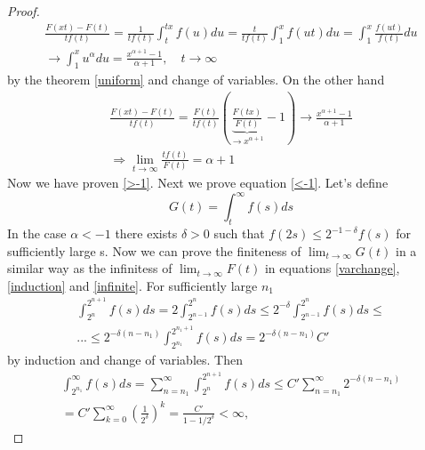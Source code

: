 \documentclass[english,12pt,a4paper,pdftex,sci,utf8]{aaltothesis} %
\begin{document}
\begin{proof}
\begin{equation*}
\begin{split}
\frac{F(xt)-F(t)}{tf(t)} = \frac{1}{tf(t)} \int_{t}^{tx}f(u)du = \frac{t}{tf(t)} \int_{1}^{x} f(ut)du = \int_1^x \frac{f(ut)}{f(t)}du \\
\rightarrow \int_1^x u^{\alpha}du = \frac{x^{\alpha+1}-1}{\alpha+1}, \quad t \rightarrow \infty
\end{split}
\end{equation*}
by the theorem \ref{uniform} and change of variables. On the other hand 
\begin{equation*}
\begin{split}
\frac{F(xt)-F(t)}{tf(t)} = \frac{F(t)}{tf(t)}\left(\underbrace{\frac{F(tx)}{F(t)}}_{\rightarrow x^{\alpha+1}} - 1\right) \rightarrow \frac{x^{\alpha+1}-1}{\alpha+1} \\
\Rightarrow \lim_{t \rightarrow \infty} \frac{tf(t)}{F(t)}= \alpha + 1
\end{split}
\end{equation*}
Now we have proven \ref{>-1}. Next we prove equation \ref{<-1}. Let's define
\begin{equation*}
G(t) = \int_{t}^{\infty} f(s)ds
\end{equation*}
In the case $\alpha<-1$ there exists $\delta>0$ such that $f(2s) \leq 2^{-1-\delta}f(s)$ for sufficiently large s. Now we can prove the finiteness of $\lim_{t \rightarrow \infty} G(t)$ in a similar way as the infinitess of $\lim_{t \rightarrow \infty} F(t)$ in equations \ref{varchange}, \ref{induction} and \ref{infinite}. For sufficiently large $n_1$
\begin{equation*}
\begin{split}
\int_{2^{n}}^{2^{n+1}} f(s)ds = 2 \int_{2^{n-1}}^{2^{n}} f(s)ds \leq 2^{-\delta} \int_{2^{n-1}}^{2^n} f(s)ds \leq \\ ... \leq 2^{-\delta(n-n_1)} \int_{2^{n_1}}^{2^{n_1+1}} f(s)ds = 2^{-\delta(n-n_1)} C'
\end{split}
\end{equation*}
by induction and change of variables. Then
\begin{equation*}
\begin{split}
\int_{2^{n_1}}^{\infty} f(s)ds = \sum_{n=n_1}^{\infty} \int_{2^{n}}^{2^{n+1}} f(s)ds \leq C' \sum_{n=n_1}^{\infty} 2^{-\delta(n-n_1)} \\
=C' \sum_{k=0}^{\infty} \left( \frac{1}{2^{\delta}}\right)^k = \frac{C'}{1-1/2^{\delta}}<\infty,
\end{split}
\end{equation*}

\end{proof}
\end{document}
